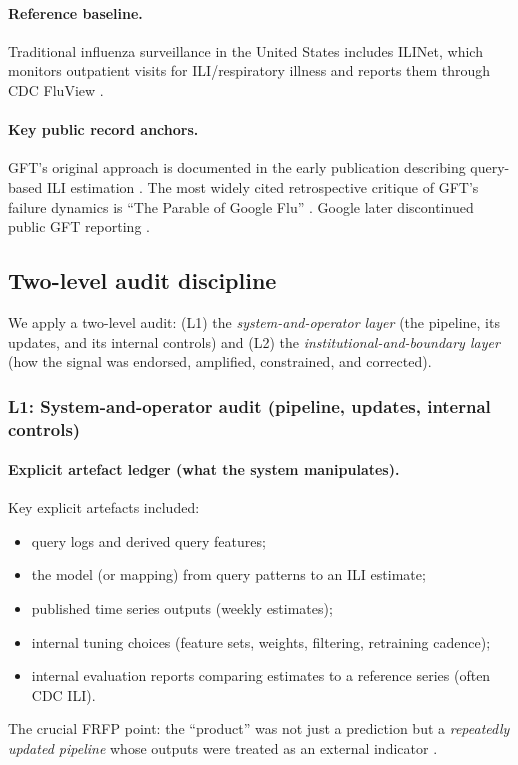 \paragraph{Reference baseline.}
Traditional influenza surveillance in the United States includes ILINet, which monitors outpatient visits for ILI/respiratory illness and reports them through CDC FluView \cite{CDCILINetOverview}.

\paragraph{Key public record anchors.}
GFT’s original approach is documented in the early publication describing query-based ILI estimation \cite{Ginsberg2009Nature}.
The most widely cited retrospective critique of GFT’s failure dynamics is “The Parable of Google Flu” \cite{Lazer2014Science}.
Google later discontinued public GFT reporting \cite{Google2015NextChapterFluTrends}.

\subsection{Two-level audit discipline}

We apply a two-level audit: (L1) the \emph{system-and-operator layer} (the pipeline, its updates, and its internal controls) and (L2) the \emph{institutional-and-boundary layer} (how the signal was endorsed, amplified, constrained, and corrected).

\subsubsection*{L1: System-and-operator audit (pipeline, updates, internal controls)}

\paragraph{Explicit artefact ledger (what the system manipulates).}
Key explicit artefacts included:
\begin{itemize}
  \item query logs and derived query features;
  \item the model (or mapping) from query patterns to an ILI estimate;
  \item published time series outputs (weekly estimates);
  \item internal tuning choices (feature sets, weights, filtering, retraining cadence);
  \item internal evaluation reports comparing estimates to a reference series (often CDC ILI).
\end{itemize}
The crucial FRFP point: the “product” was not just a prediction but a \emph{repeatedly updated pipeline} whose outputs were treated as an external indicator \cite{Lazer2014Science}.

